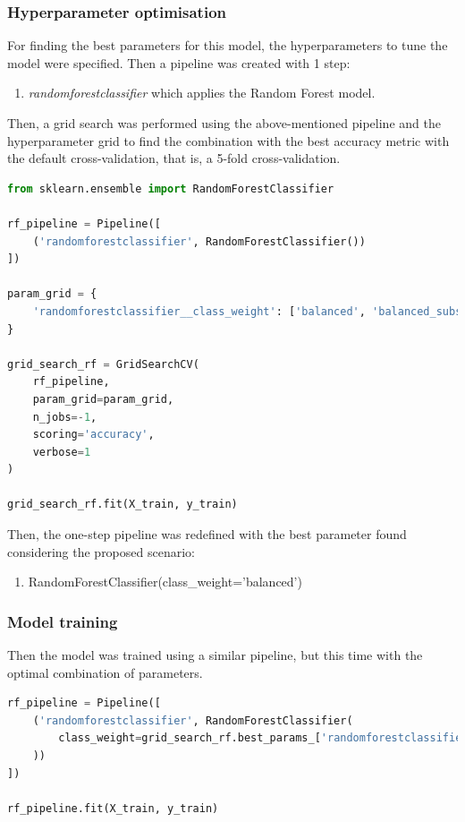 \documentclass{article}
\begin{document}
\subsubsection{Hyperparameter optimisation}
For finding the best parameters for this model, the hyperparameters to tune the model were specified. Then a pipeline was created with 1 step:
\begin{enumerate}
\item \emph{randomforestclassifier} which applies the Random Forest model.
\end{enumerate}

Then, a grid search was performed using the above-mentioned pipeline and the hyperparameter grid to find the combination with the best accuracy metric with the default cross-validation, that is, a 5-fold cross-validation.
\begin{lstlisting}[language=Python]
from sklearn.ensemble import RandomForestClassifier

rf_pipeline = Pipeline([
    ('randomforestclassifier', RandomForestClassifier())
])

param_grid = {
    'randomforestclassifier__class_weight': ['balanced', 'balanced_subsample']
}

grid_search_rf = GridSearchCV(
    rf_pipeline,
    param_grid=param_grid,
    n_jobs=-1,
    scoring='accuracy',
    verbose=1
)

grid_search_rf.fit(X_train, y_train)
\end{lstlisting}

Then, the one-step pipeline was redefined with the best parameter found considering the proposed scenario:
\begin{enumerate}    
    \item RandomForestClassifier(class\_weight='balanced')
\end{enumerate}

\subsubsection{Model training}
Then the model was trained using a similar pipeline, but this time with the optimal combination of parameters.

\begin{lstlisting}[language=Python]
rf_pipeline = Pipeline([
    ('randomforestclassifier', RandomForestClassifier(
        class_weight=grid_search_rf.best_params_['randomforestclassifier__class_weight']
    ))
])

rf_pipeline.fit(X_train, y_train)
\end{lstlisting}
\end{document}
